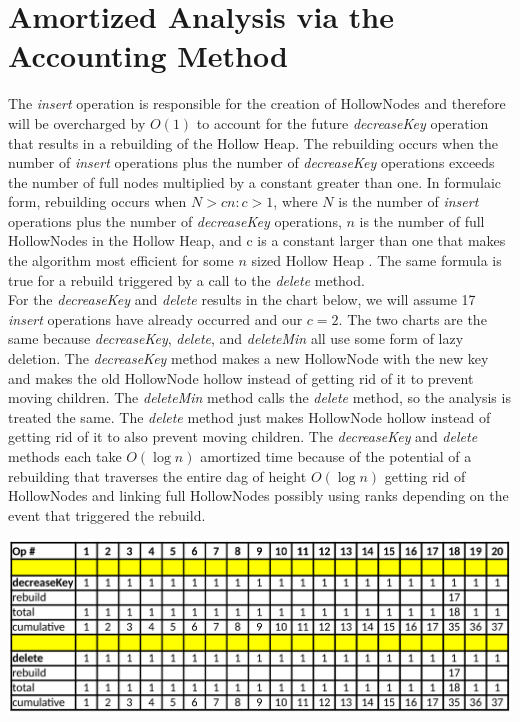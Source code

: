 \documentclass[letter,10pt]{article}
\begin{document}
\section{Amortized Analysis via the Accounting Method}
\quad The \textit{insert} operation is responsible for the creation of HollowNodes and therefore will be overcharged by $O(1)$ to account for the future \textit{decreaseKey} operation that results in a rebuilding of the Hollow Heap. The rebuilding occurs when the number of \textit{insert} operations plus the number of \textit{decreaseKey} operations exceeds the number of full nodes multiplied by a constant greater than one. In formulaic form, rebuilding occurs when $N > cn: c > 1$, where $N$ is the number of \textit{insert} operations plus the number of \textit{decreaseKey} operations, $n$ is the number of full HollowNodes in the Hollow Heap, and c is a constant larger than one that makes the algorithm most efficient for some $n$ sized Hollow Heap \cite{hollow}. The same formula is true for a rebuild triggered by a call to the \textit{delete} method.\\

For the \textit{decreaseKey} and \textit{delete} results in the chart below, we will assume 17 \textit{insert} operations have already occurred and our $c = 2$. The two charts are the same because \textit{decreaseKey}, \textit{delete}, and \textit{deleteMin} all use some form of lazy deletion. The \textit{decreaseKey} method makes a new HollowNode with the new key and makes the old HollowNode hollow instead of getting rid of it to prevent moving children. The \textit{deleteMin} method calls the \textit{delete} method, so the analysis is treated the same. The \textit{delete} method just makes HollowNode hollow instead of getting rid of it to also prevent moving children. The \textit{decreaseKey} and \textit{delete} methods each take $O(\log n)$ amortized time because of the potential of a rebuilding that traverses the entire dag of height $O(\log n)$ getting rid of HollowNodes and linking full HollowNodes possibly using ranks depending on the event that triggered the rebuild.\\
\begin{center}
	\includegraphics[width=\textwidth]{accounting.png}
\end{center}
\end{document}
